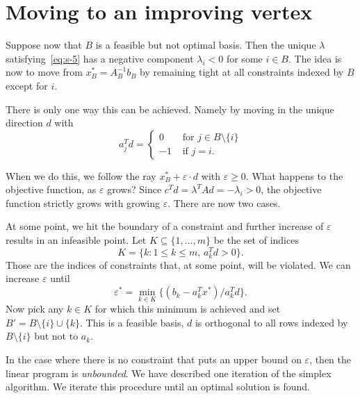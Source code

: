 \section{Moving to an improving vertex}
\label{sec:moving-an-improving}

Suppose now that $B$ is a feasible but not optimal basis. Then the
unique $\lambda$ satisfying~\eqref{eq:s-5} has a negative component
$\lambda_i<0$ for some $i \in B$. The idea is now to move from $x^*_B
= A_B^{-1}b_B$ by remaining tight at all constraints indexed by $B$
except for $i$.

There is only one way this can be achieved. Namely by moving in the unique direction $d$ with
\begin{displaymath}
  a_j^T d =
  \begin{cases}
    0 & \text{ for } j \in B \setminus \{i\} \\
    -1 & \text{ if } j =i.
  \end{cases}
\end{displaymath}

When we do this, we follow the ray $x^*_B + \varepsilon \cdot d$ with $\varepsilon
\geq 0$. What happens to the objective function, as $\varepsilon$ grows? Since
$c^Td = \lambda^TA d = -\lambda_i >0$, the objective function strictly
grows with growing $\varepsilon$. There are now two cases. 

At some point, we hit the boundary of a constraint and further increase of $\varepsilon$ results in an infeasible point. Let $K \subseteq \{ 1,\dots,m\}$ be the set of indices 
\begin{equation}
  \label{eq:s-6}
  K = \{ k \colon 1 \leq k \leq m, \,a_k^T d >0\}. 
\end{equation}
Those are the indices of constraints that, at some point, will be violated. We can increase $\varepsilon$ until 
\begin{equation}
  \label{eq:s-8}
  \varepsilon^* = \min_{k \in K} \{ (b_k - a_k^Tx^*) / a_k^Td\}. 
\end{equation}
Now pick any $k \in K$ for which this minimum is achieved and set $B' = B \setminus \{i\} \cup \{k\}$. This is a feasible basis, $d$ is orthogonal to all rows  indexed by $B \setminus \{i\}$ but not to $a_k$. 

In the case where there is no constraint that puts an upper bound on $\varepsilon$, then the linear program is \emph{unbounded}. 
We have described one iteration of the simplex algorithm. We iterate this procedure until an optimal solution is found. 



